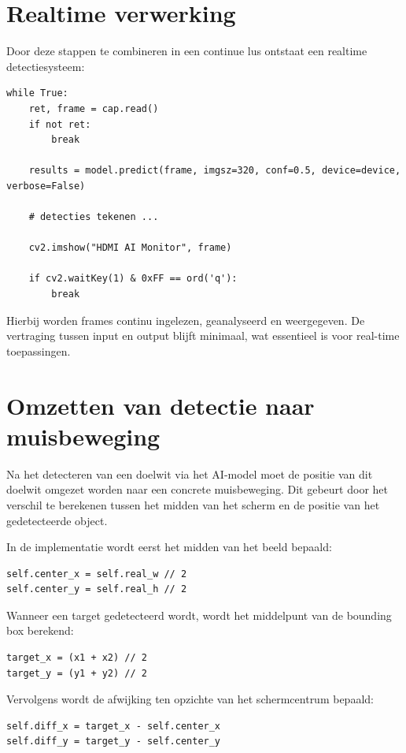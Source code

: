 \section{Realtime verwerking}

Door deze stappen te combineren in een continue lus ontstaat een realtime detectiesysteem:

\begin{verbatim}
while True:
    ret, frame = cap.read()
    if not ret:
        break

    results = model.predict(frame, imgsz=320, conf=0.5, device=device, verbose=False)

    # detecties tekenen ...

    cv2.imshow("HDMI AI Monitor", frame)

    if cv2.waitKey(1) & 0xFF == ord('q'):
        break
\end{verbatim}

Hierbij worden frames continu ingelezen, geanalyseerd en weergegeven. De vertraging tussen input en output blijft minimaal, wat essentieel is voor real-time toepassingen.

\section{Omzetten van detectie naar muisbeweging}

Na het detecteren van een doelwit via het AI-model moet de positie van dit doelwit omgezet worden naar een concrete muisbeweging. Dit gebeurt door het verschil te berekenen tussen het midden van het scherm en de positie van het gedetecteerde object.

In de implementatie wordt eerst het midden van het beeld bepaald:

\begin{verbatim}
self.center_x = self.real_w // 2
self.center_y = self.real_h // 2
\end{verbatim}

Wanneer een target gedetecteerd wordt, wordt het middelpunt van de bounding box berekend:

\begin{verbatim}
target_x = (x1 + x2) // 2
target_y = (y1 + y2) // 2
\end{verbatim}

Vervolgens wordt de afwijking ten opzichte van het schermcentrum bepaald:

\begin{verbatim}
self.diff_x = target_x - self.center_x
self.diff_y = target_y - self.center_y
\end{verbatim}

